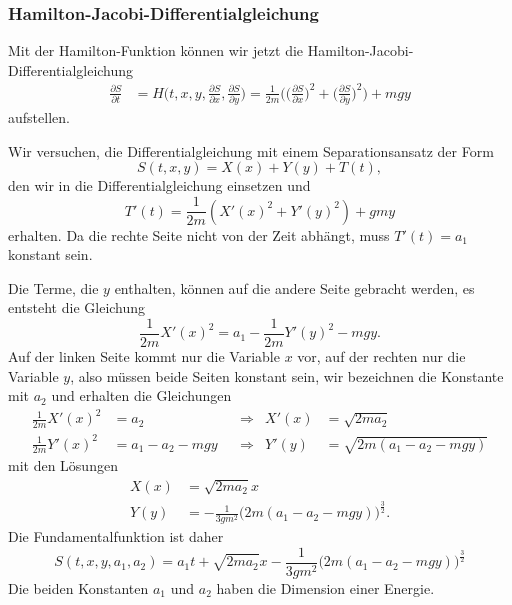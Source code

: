 %
%
\subsubsection{Hamilton-Jacobi-Differentialgleichung}
Mit der Hamilton-Funktion können wir jetzt die
Hamilton-Jacobi-Differentialgleichung 
\begin{align*}
\frac{\partial S}{\partial t}
&=
H\biggl(
t,x,y,\frac{\partial S}{\partial x},\frac{\partial S}{\partial y}
\biggr)
=
\frac1{2m}\biggl(
\biggl(\frac{\partial S}{\partial x}\biggr)^2
+
\biggl(\frac{\partial S}{\partial y}\biggr)^2
\biggr)
+
mgy
\end{align*}
aufstellen.

Wir versuchen, die Differentialgleichung mit einem Separationsansatz
der Form
\[
S(t,x,y)
=
X(x)
+
Y(y)
+
T(t),
\]
den wir in die Differentialgleichung einsetzen und
\[
T'(t)
=
\frac1{2m}(X'(x)^2 + Y'(y)^2)
+
gmy
\]
erhalten.
Da die rechte Seite nicht von der Zeit abhängt, muss $T'(t) = a_1$ konstant
sein.

Die Terme, die $y$ enthalten, können auf die andere Seite gebracht
werden, es entsteht die Gleichung
\[
\frac{1}{2m}X'(x)^2
=
a_1-\frac{1}{2m}Y'(y)^2 -mgy.
\]
Auf der linken Seite kommt nur die Variable $x$ vor, auf der rechten
nur die Variable $y$, also müssen beide Seiten konstant sein,
wir bezeichnen die Konstante mit $a_2$ und erhalten die Gleichungen
\begin{align*}
\frac1{2m}X'(x)^2&= a_2
&&\Rightarrow&
X'(x) &= \sqrt{2ma_2}
\\
\frac1{2m}Y'(x)^2&=a_1-a_2-mgy
&&\Rightarrow&
Y'(y) &= \sqrt{2m(a_1-a_2-mgy)}
\end{align*}
mit den Lösungen
\begin{align*}
X(x) &= \sqrt{2ma_2}x
\\
Y(y) &=
-\frac{1}{3gm^2}
\bigl(2m(a_1-a_2-mgy)\bigr)^{\frac32}.
\end{align*}
Die Fundamentalfunktion ist daher
\[
S(t,x,y,a_1,a_2)
=
a_1t
+
\sqrt{2ma_2}x
-
\frac{1}{3gm^2}
\bigl(2m(a_1-a_2-mgy)\bigr)^{\frac32}
\]
Die beiden Konstanten $a_1$ und $a_2$ haben die Dimension einer
Energie.

%
%
